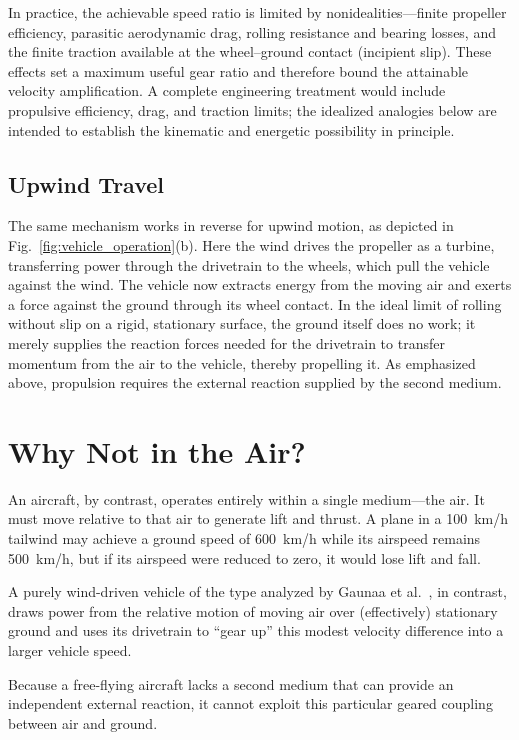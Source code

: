 \documentclass[reprint,aps,pra,longbibliography]{revtex4-2}
\begin{document}
In practice, the achievable speed ratio is limited by nonidealities---finite propeller efficiency, parasitic aerodynamic drag, rolling resistance and bearing losses, and the finite traction available at the wheel--ground contact (incipient slip). These effects set a maximum useful gear ratio and therefore bound the attainable velocity amplification. A complete engineering treatment would include propulsive efficiency, drag, and traction limits; the idealized analogies below are intended to establish the kinematic and energetic possibility in principle.

\subsection{Upwind Travel}

The same mechanism works in reverse for upwind motion, as depicted in Fig.~\ref{fig:vehicle_operation}(b). Here the wind drives the propeller as a turbine, transferring power through the drivetrain to the wheels, which pull the vehicle against the wind.
The vehicle now extracts energy from the moving air and exerts a force against the ground through its wheel contact. In the ideal limit of rolling without slip on a rigid, stationary surface, the ground itself does no work; it merely supplies the reaction forces needed for the drivetrain to transfer momentum from the air to the vehicle, thereby propelling it.
As emphasized above, propulsion requires the external reaction supplied by the second medium.

\section{Why Not in the Air?}
\label{wind:whynotintheair}

An aircraft, by contrast, operates entirely within a single medium---the air. It must move relative to that air to generate lift and thrust.
A plane in a \SI{100}{km/h} tailwind may achieve a ground speed of \SI{600}{km/h} while its airspeed remains \SI{500}{km/h}, but if its airspeed were reduced to zero, it would lose lift and fall.

A purely wind-driven vehicle of the type analyzed by Gaunaa et al.~\cite{Gaunaa2009}, in contrast, draws power from the relative motion of moving air over (effectively) stationary ground and uses its drivetrain to ``gear up'' this modest velocity difference into a larger vehicle speed.

Because a free-flying aircraft lacks a second medium that can provide an
independent external reaction, it cannot exploit this particular geared
coupling between air and ground.
\end{document}
